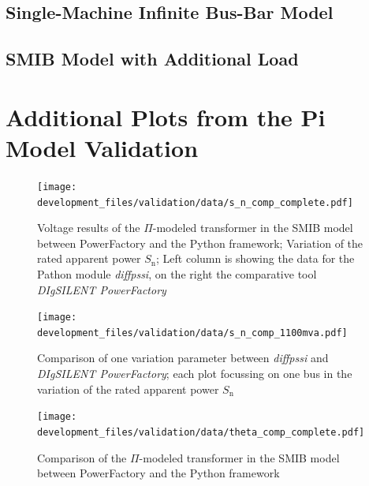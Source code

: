 \subsection{Single-Machine Infinite Bus-Bar Model}
\label{app:smib-model}


\subsection{SMIB Model with Additional Load}
\label{app:smib-w-load}



\section{Additional Plots from the  Pi Model Validation}
\label{app:add-validation-plots}

\begin{figure}[H]
    \centering
    \texttt{[image: development\_files/validation/data/s\_n\_comp\_complete.pdf]}
    \caption[Model results concerning the variation of the rated apparent power]{Voltage results of the $\Pi$-modeled transformer in the \acs{SMIB} model between PowerFactory and the Python framework; Variation of the rated apparent power $S_\mathrm{n}$; Left column is showing the data for the Pathon module \textit{diffpssi}, on the right the comparative tool \textit{DIgSILENT PowerFactory}}
    \label{fig:valid-s-compl}
\end{figure}

\begin{figure}[H]
    \centering
    \texttt{[image: development\_files/validation/data/s\_n\_comp\_1100mva.pdf]}
    \caption{Comparison of one variation parameter between \textit{diffpssi} and \textit{DIgSILENT PowerFactory}; each plot focussing on one bus in the variation of the rated apparent power $S_\mathrm{n}$}
    \label{fig:valid-s-1100}
\end{figure}

\begin{figure}[H]
    \centering
    \texttt{[image: development\_files/validation/data/theta\_comp\_complete.pdf]}
    \caption{Comparison of the $\Pi$-modeled transformer in the \acs{SMIB} model between PowerFactory and the Python framework}
    \label{fig:valid-ratio-comp}
\end{figure}

